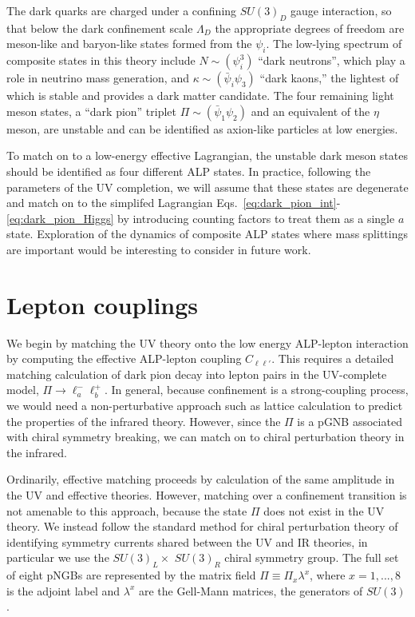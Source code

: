 The dark quarks are charged under a confining $SU(3)_D$ gauge interaction, so that below the dark confinement scale $\Lambda_D$ the appropriate degrees of freedom are meson-like and baryon-like states formed from the $\psi_i$.  The low-lying spectrum of composite states in this theory include $N \sim (\psi_i^3)$ ``dark neutrons'', which play a role in neutrino mass generation, and $\kappa \sim (\bar{\psi}_i \psi_3)$ ``dark kaons,'' the lightest of which is stable and provides a dark matter candidate.  The four remaining light meson states,   a ``dark pion'' triplet $\Pi \sim (\bar{\psi}_1 \psi_2)$ and an equivalent of the $\eta$ meson, are unstable and can be identified as axion-like particles at low energies.

To match on to a low-energy effective Lagrangian, the unstable dark meson states should be identified as four different ALP states.  In practice, following the parameters of the UV completion, we will assume that these states are degenerate and match on to the simplifed Lagrangian  Eqs.~\ref{eq:dark_pion_int}-\ref{eq:dark_pion_Higgs} by introducing counting factors to treat them as a single $a$ state.  Exploration of the dynamics of composite ALP states where mass splittings are important would be interesting to consider in future work.

\section{Lepton couplings}

We begin by matching the UV theory onto the low energy ALP-lepton interaction by computing the effective ALP-lepton coupling $C_{\ell \ell'}$.  This requires a detailed matching calculation of dark pion decay into lepton pairs in the UV-complete model, $\Pi \rightarrow \ell_a^- \ell_b^+$.  In general, because confinement is a strong-coupling process, we would need a non-perturbative approach such as lattice calculation to predict the properties of the infrared theory.  However, since the $\Pi$ is a pGNB associated with chiral symmetry breaking, we can match on to chiral perturbation theory in the infrared. 

Ordinarily, effective matching proceeds by calculation of the same amplitude in the UV and effective theories.  However, matching over a confinement transition is not amenable to this approach, because the state $\Pi$ does not exist in the UV theory.  We instead follow the standard method for chiral perturbation theory of identifying symmetry currents shared between the UV and IR theories, in particular we use the $SU(3)_L \times$ $SU(3)_R$ chiral symmetry group.  The full set of eight pNGBs are represented by the matrix field $\Pi \equiv \Pi_x \lambda^x$, where $x = 1,...,8$ is the adjoint label and $\lambda^x$ are the Gell-Mann matrices, the generators of $SU(3)$.

